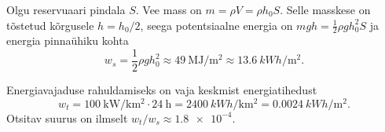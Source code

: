 \documentclass[10pt]{article}
\begin{document}

\solu
Olgu reservuaari pindala $S$. Vee mass on $m=\rho V=\rho h_0S$. Selle masskese on tõstetud kõrgusele $h=h_0/2$, seega potentsiaalne energia on $mgh=\frac{1}{2}\rho gh_0^2S$ ja energia pinnaühiku kohta
\[
w_s=\frac{1}{2}\rho gh_0^2\approx \SI{49}{\mega\joule\per\meter\squared}\approx\SI{13.6}{kWh\per\meter\squared}.
\]

Energiavajaduse rahuldamiseks on vaja keskmist energiatihedust
\[
w_t=\SI{100}{\kilo\watt\per\kilo\meter\squared}\cdot \SI{24}{\hour}=\SI{2400}{kWh\per\kilo\meter\squared}=\SI{0.0024}{kWh\per\meter\squared}.
\]
Otsitav suurus on ilmselt $w_t/w_s\approx \num{1.8e-4}$.
\probend
\bigskip

\setAuthor{}
\end{document}
